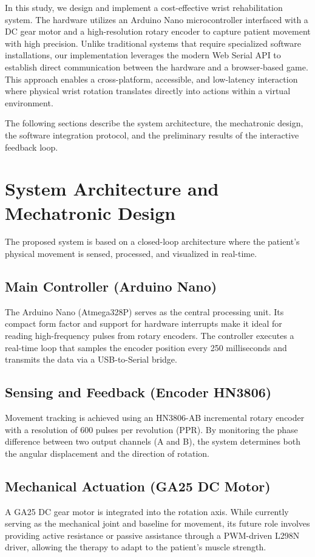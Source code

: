 \documentclass[conference]{IEEEtran}
\begin{document}
  In this study, we design and implement a cost-effective wrist rehabilitation system. The hardware utilizes an Arduino Nano microcontroller interfaced with a DC gear motor and a high-resolution rotary encoder to capture patient movement with high precision. Unlike traditional systems that require specialized software installations, our implementation leverages the modern Web Serial API to establish direct communication between the hardware and a browser-based game. This approach enables a cross-platform, accessible, and low-latency interaction where physical wrist rotation translates directly into actions within a virtual environment.

  The following sections describe the system architecture, the mechatronic design, the software integration protocol, and the preliminary results of the interactive feedback loop.

  \section{System Architecture and Mechatronic Design}

  The proposed system is based on a closed-loop architecture where the patient's physical movement is sensed, processed, and visualized in real-time.

  \subsection{Main Controller (Arduino Nano)}
  The Arduino Nano (Atmega328P) serves as the central processing unit. Its compact form factor and support for hardware interrupts make it ideal for reading high-frequency pulses from rotary encoders. The controller executes a real-time loop that samples the encoder position every 250 milliseconds and transmits the data via a USB-to-Serial bridge.

  \subsection{Sensing and Feedback (Encoder HN3806)}
  Movement tracking is achieved using an HN3806-AB incremental rotary encoder with a resolution of 600 pulses per revolution (PPR). By monitoring the phase difference between two output channels (A and B), the system determines both the angular displacement and the direction of rotation.

  \subsection{Mechanical Actuation (GA25 DC Motor)}
  A GA25 DC gear motor is integrated into the rotation axis. While currently serving as the mechanical joint and baseline for movement, its future role involves providing active resistance or passive assistance through a PWM-driven L298N driver, allowing the therapy to adapt to the patient's muscle strength.
\end{document}
